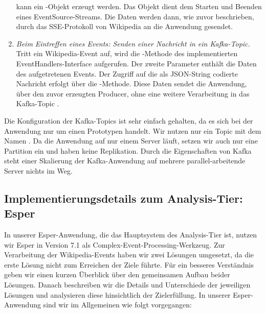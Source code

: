\begin{enumerate}
    kann ein -Objekt erzeugt werden. Das Objekt dient dem Starten und Beenden eines EventSource-Streams.
    Die Daten werden dann, wie zuvor beschrieben, durch das SSE-Protokoll von Wikipedia an die Anwendung gesendet.
    \item \textit{Beim Eintreffen eines Events: Senden einer Nachricht in ein Kafka-Topic.} Tritt ein Wikipedia-Event auf,
    wird die -Methode des implementierten EventHandlers-Interface aufgerufen. Der zweite Parameter enthält die Daten
    des aufgetretenen Events. Der Zugriff auf die als JSON-String codierte Nachricht erfolgt über die -Methode.
    Diese Daten sendet die Anwendung, über den zuvor erzeugten Producer, ohne eine weitere
    Verarbeitung in das Kafka-Topic .
\end{enumerate}

Die Konfiguration der Kafka-Topics ist sehr einfach gehalten, da es sich bei der Anwendung nur um einen Prototypen handelt.
Wir nutzen nur ein Topic mit dem Namen . Da die Anwendung auf nur einem Server läuft, setzen wir auch nur
eine Partition ein und haben keine Replikation. Durch die Eigenschaften von Kafka steht einer Skalierung der Kafka-Anwendung
auf mehrere parallel-arbeitende Server nichts im Weg.

\subsection{Implementierungsdetails zum Analysis-Tier: Esper}
In unserer Esper-Anwendung, die das Hauptsystem des Analysis-Tier ist, nutzen wir Esper in Version 7.1
als Complex-Event-Processing-Werkzeug.
Zur Verarbeitung der Wikipedia-Events haben wir zwei Lösungen umgesetzt, da die erste Lösung nicht
zum Erreichen der Ziele führte. Für ein besseres Verständnis geben wir einen kurzen Überblick über den gemeinsamen Aufbau beider
Lösungen. Danach beschreiben wir die Details und Unterschiede der jeweiligen Lösungen und analysieren diese hinsichtlich der
Zielerfüllung.
In unserer Esper-Anwendung sind wir im Allgemeinen wie folgt vorgegangen:

